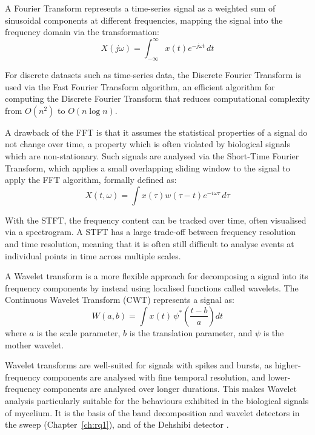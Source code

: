 A Fourier Transform represents a time-series signal as a weighted sum of sinusoidal components at different frequencies, mapping the signal into the frequency domain via the transformation:
\begin{equation}
X(j\omega) = \int_{-\infty}^{\infty} x(t) e^{-j\omega t}\,dt
\end{equation}

For discrete datasets such as time-series data, the Discrete Fourier Transform is used via the Fast Fourier Transform algorithm, an efficient algorithm for computing the Discrete Fourier Transform that reduces computational complexity from $O(n^2)$ to $O(n \log n)$.

A drawback of the FFT is that it assumes the statistical properties of a signal do not change over time, a property which is often violated by biological signals which are non-stationary. Such signals are analysed via the Short-Time Fourier Transform, which applies a small overlapping sliding window to the signal to apply the FFT algorithm, formally defined as:
\begin{equation}
X(t,\omega) = \int x(\tau) w(\tau - t) e^{-i\omega\tau}\,d\tau
\end{equation}

With the STFT, the frequency content can be tracked over time, often visualised via a spectrogram. A STFT has a large trade-off between frequency resolution and time resolution, meaning that it is often still difficult to analyse events at individual points in time across multiple scales.

A Wavelet transform is a more flexible approach for decomposing a signal into its frequency components by instead using localised functions called wavelets. The Continuous Wavelet Transform (CWT) represents a signal as:
\begin{equation}
W(a,b) = \int x(t)\,\psi^{*}\!\left(\frac{t-b}{a}\right)dt
\end{equation}
where $a$ is the scale parameter, $b$ is the translation parameter, and $\psi$ is the mother wavelet.

Wavelet transforms are well-suited for signals with spikes and bursts, as higher-frequency components are analysed with fine temporal resolution, and lower-frequency components are analysed over longer durations. This makes Wavelet analysis particularly suitable for the behaviours exhibited in the biological signals of mycelium. It is the basis of the band decomposition and wavelet detectors in the sweep (Chapter~\ref{ch:rq1}), and of the Dehshibi detector \cite{dehshibi}.

